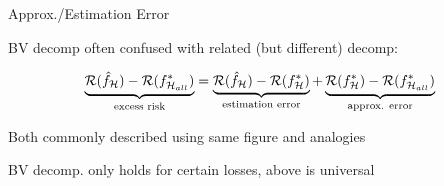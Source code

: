 \documentclass[11pt,compress,t,notes=noshow, xcolor=table]{beamer}
\begin{document}


\begin{framei}[sep=M]{Approx./Estimation Error }

\item BV decomp often confused with related (but different) decomp: 

$$
\underbrace{\mathcal{R}(\hat f_{\mathcal{H}}) - \mathcal{R}(f^{\ast}_{\mathcal{H}_{all}})}_{\text{excess risk}} = \underbrace{\mathcal{R}(\hat f_{\mathcal{H}}) - \mathcal{R}(f^{\ast}_{\mathcal{H}})}_{\text{estimation error}} + \underbrace{\mathcal{R}(f^{\ast}_{\mathcal{H}}) -  \mathcal{R}(f^{\ast}_{\mathcal{H}_{all}})}_{\text{approx. error}} 
$$

\item Both commonly described using same figure and analogies


\vfill


\item BV decomp. only holds for certain losses, above is universal


\end{framei}
\end{document}
